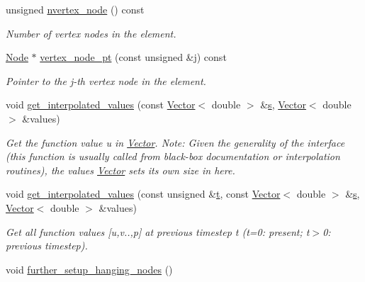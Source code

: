 \begin{DoxyCompactItemize}
unsigned \hyperlink{classoomph_1_1RefineableGeneralisedNewtonianQCrouzeixRaviartElement_ac4a1100a3a8dc6f4994b622e50a76166}{nvertex\+\_\+node} () const
\begin{DoxyCompactList}\small\item\em Number of vertex nodes in the element. \end{DoxyCompactList}\item 
\hyperlink{classoomph_1_1Node}{Node} $\ast$ \hyperlink{classoomph_1_1RefineableGeneralisedNewtonianQCrouzeixRaviartElement_a5c5acb0207b889707b138eec04b2b94d}{vertex\+\_\+node\+\_\+pt} (const unsigned \&j) const
\begin{DoxyCompactList}\small\item\em Pointer to the j-\/th vertex node in the element. \end{DoxyCompactList}\item 
void \hyperlink{classoomph_1_1RefineableGeneralisedNewtonianQCrouzeixRaviartElement_ad67f1f733c17cbf0da9b1d5429b9fcf0}{get\+\_\+interpolated\+\_\+values} (const \hyperlink{classoomph_1_1Vector}{Vector}$<$ double $>$ \&\hyperlink{cfortran_8h_ab7123126e4885ef647dd9c6e3807a21c}{s}, \hyperlink{classoomph_1_1Vector}{Vector}$<$ double $>$ \&values)
\begin{DoxyCompactList}\small\item\em Get the function value u in \hyperlink{classoomph_1_1Vector}{Vector}. Note\+: Given the generality of the interface (this function is usually called from black-\/box documentation or interpolation routines), the values \hyperlink{classoomph_1_1Vector}{Vector} sets its own size in here. \end{DoxyCompactList}\item 
void \hyperlink{classoomph_1_1RefineableGeneralisedNewtonianQCrouzeixRaviartElement_a6cbe5e87cd25badfbe4a83b853a8055d}{get\+\_\+interpolated\+\_\+values} (const unsigned \&\hyperlink{cfortran_8h_af6f0bd3dc13317f895c91323c25c2b8f}{t}, const \hyperlink{classoomph_1_1Vector}{Vector}$<$ double $>$ \&\hyperlink{cfortran_8h_ab7123126e4885ef647dd9c6e3807a21c}{s}, \hyperlink{classoomph_1_1Vector}{Vector}$<$ double $>$ \&values)
\begin{DoxyCompactList}\small\item\em Get all function values \mbox{[}u,v..,p\mbox{]} at previous timestep t (t=0\+: present; t$>$0\+: previous timestep). \end{DoxyCompactList}\item 
void \hyperlink{classoomph_1_1RefineableGeneralisedNewtonianQCrouzeixRaviartElement_a7c7296ef46ec95a58de4b24201e7d7c1}{further\+\_\+setup\+\_\+hanging\+\_\+nodes} ()

\end{DoxyCompactItemize}
